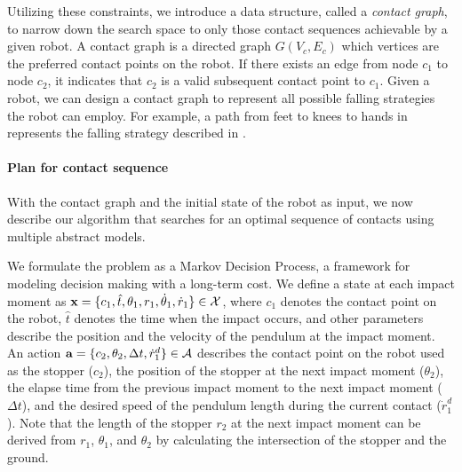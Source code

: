 Utilizing these constraints, we introduce a data structure, called a
\emph{contact graph}, to narrow down the search space to only those
contact sequences achievable by a given robot. A contact graph is a
directed graph $G(V_{c}, E_{c})$ which vertices are the preferred
contact points on the robot. If there exists an edge from node $c_1$
to node $c_2$, it indicates that $c_2$ is a valid subsequent contact
point to $c_1$. Given a robot, we can design a contact graph to
represent all possible falling strategies the robot can employ. For
example, a path from feet to knees to hands in 
represents the falling strategy described in \cite{Fujiwara:2002:UFM}.

\paragraph{Plan for contact sequence}
With the contact graph and the initial state of the robot as input, we
now describe our algorithm that searches for an optimal sequence of
contacts using multiple abstract models. 

We formulate the problem as a Markov Decision Process, a framework for
modeling decision making with a long-term cost. We define a state at
each impact moment as
$\mathbf{x} = \{c_1, \hat{t},\theta_1, r_1, \dot{\theta}_1, \dot{r}_1\}
\in \mathcal{X}$,
where $c_1$ denotes the contact point on the robot, $\hat{t}$ denotes
the time when the impact occurs, and other parameters describe the
position and the velocity of the pendulum at the impact moment. An
action
$\mathbf{a}=\{c_2, \theta_2, \Delta t, \dot{r}^d_1\} \in \mathcal{A}$
describes the contact point on the robot used as the stopper ($c_2$),
the position of the stopper at the next impact moment ($\theta_2$),
the elapse time from the previous impact moment to the next impact
moment ($\Delta t$), and the desired speed of the pendulum length
during the current contact ($\dot{r}^d_1$). Note that the length of
the stopper $r_2$ at the next impact moment can be derived from $r_1$,
$\theta_1$, and $\theta_2$ by calculating the intersection of the
stopper and the ground.


